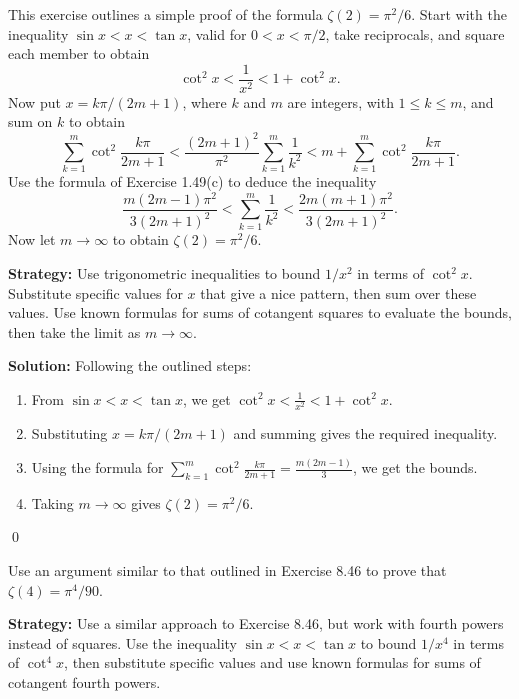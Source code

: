 \begin{problembox}
This exercise outlines a simple proof of the formula \(\zeta(2) = \pi^2/6\). Start with the inequality \(\sin x < x < \tan x\), valid for \(0 < x < \pi/2\), take reciprocals, and square each member to obtain
\[\cot^2 x < \frac{1}{x^2} < 1 + \cot^2 x.\]
Now put \(x = k\pi/(2m + 1)\), where \(k\) and \(m\) are integers, with \(1 \leq k \leq m\), and sum on \(k\) to obtain
\[\sum_{k=1}^{m} \cot^2 \frac{k\pi}{2m + 1} < \frac{(2m + 1)^2}{\pi^2} \sum_{k=1}^{m} \frac{1}{k^2} < m + \sum_{k=1}^{m} \cot^2 \frac{k\pi}{2m + 1}.\]
Use the formula of Exercise 1.49(c) to deduce the inequality
\[\frac{m(2m - 1)\pi^2}{3(2m + 1)^2} < \sum_{k=1}^m \frac{1}{k^2} < \frac{2m(m + 1)\pi^2}{3(2m + 1)^2}.\]
Now let \(m \to \infty\) to obtain \(\zeta(2) = \pi^2/6\).
\end{problembox}

\noindent\textbf{Strategy:} Use trigonometric inequalities to bound \(1/x^2\) in terms of \(\cot^2 x\). Substitute specific values for \(x\) that give a nice pattern, then sum over these values. Use known formulas for sums of cotangent squares to evaluate the bounds, then take the limit as \(m \to \infty\).

\bigskip\noindent\textbf{Solution:}
Following the outlined steps:
\begin{enumerate}
\item From \(\sin x < x < \tan x\), we get \(\cot^2 x < \frac{1}{x^2} < 1 + \cot^2 x\).
\item Substituting \(x = k\pi/(2m + 1)\) and summing gives the required inequality.
\item Using the formula for \(\sum_{k=1}^m \cot^2 \frac{k\pi}{2m + 1} = \frac{m(2m-1)}{3}\), we get the bounds.
\item Taking \(m \to \infty\) gives \(\zeta(2) = \pi^2/6\).
\end{enumerate}\qed




\begin{problembox}
Use an argument similar to that outlined in Exercise 8.46 to prove that \(\zeta(4) = \pi^4/90\).
\end{problembox}

\noindent\textbf{Strategy:} Use a similar approach to Exercise 8.46, but work with fourth powers instead of squares. Use the inequality \(\sin x < x < \tan x\) to bound \(1/x^4\) in terms of \(\cot^4 x\), then substitute specific values and use known formulas for sums of cotangent fourth powers.

